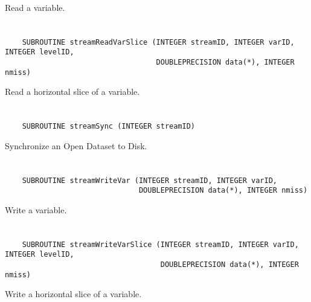 Read a variable.


\section*{\tt {}}

\begin{verbatim}
    SUBROUTINE streamReadVarSlice (INTEGER streamID, INTEGER varID, INTEGER levelID,
                                   DOUBLEPRECISION data(*), INTEGER nmiss)
\end{verbatim}

Read a horizontal slice of a variable.


\section*{\tt {}}

\begin{verbatim}
    SUBROUTINE streamSync (INTEGER streamID)
\end{verbatim}

Synchronize an Open Dataset to Disk.


\section*{\tt {}}

\begin{verbatim}
    SUBROUTINE streamWriteVar (INTEGER streamID, INTEGER varID,
                               DOUBLEPRECISION data(*), INTEGER nmiss)
\end{verbatim}

Write a variable.


\section*{\tt {}}

\begin{verbatim}
    SUBROUTINE streamWriteVarSlice (INTEGER streamID, INTEGER varID, INTEGER levelID,
                                    DOUBLEPRECISION data(*), INTEGER nmiss)
\end{verbatim}

Write a horizontal slice of a variable.


\section*{\tt {}}

